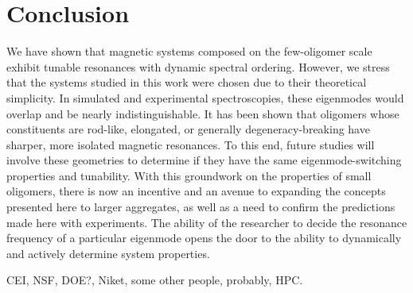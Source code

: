 \documentclass[journal=apchd5,manuscript=article]{achemso}
\begin{document}
\section{Conclusion}
We have shown that magnetic systems composed on the few-oligomer scale exhibit tunable resonances with dynamic spectral ordering. However, we stress that the systems studied in this work were chosen due to their theoretical simplicity. In simulated and experimental spectroscopies, these eigenmodes would overlap and be nearly indistinguishable. It has been shown that oligomers whose constituents are rod-like, elongated, or generally degeneracy-breaking have sharper, more isolated magnetic resonances\cite{Cherqui2016}. To this end, future studies will involve these geometries to determine if they have the same eigenmode-switching properties and tunability. With this groundwork on the properties of small oligomers, there is now an incentive and an avenue to expanding the concepts presented here to larger aggregates, as well as a need to confirm the predictions made here with experiments. The ability of the researcher to decide the resonance frequency of a particular eigenmode opens the door to the ability to dynamically and actively determine system properties.

\begin{acknowledgement}
CEI, NSF, DOE?, Niket, some other people, probably, HPC.
\end{acknowledgement}


\end{document}
